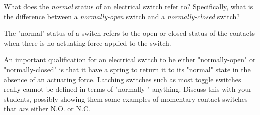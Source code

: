 

What does the {\it normal} status of an electrical switch refer to?  Specifically, what is the difference between a {\it normally-open} switch and a {\it normally-closed} switch?







The "normal" status of a switch refers to the open or closed status of the contacts when there is no actuating force applied to the switch.







An important qualification for an electrical switch to be either "normally-open" or "normally-closed" is that it have a spring to return it to its "normal" state in the absence of an actuating force.  Latching switches such as most toggle switches really cannot be defined in terms of "normally-" anything.  Discuss this with your students, possibly showing them some examples of momentary contact switches that {\it are} either N.O. or N.C.




